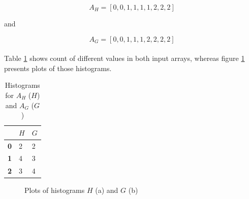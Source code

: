 \begin{equation*}
	A_H = [0,0,1,1,1,1,2,2,2]
\end{equation*}

and

\begin{equation*}
	A_G = [0,0,1,1,1,2,2,2,2]
\end{equation*}

\paragraph{}
Table \ref{tab:histogram_comparison} shows count of different values in both input arrays, whereas figure \ref{fig:histogram_comparison_plot} presents plots of those histograms.

\begin{table}[H]
    \centering
	\begin{spacing}{1.5}    
    \begin{tabular}{|l|l|l|}
        \hline
        \cellcolor{gray} & \textbf{$H$} & \textbf{$G$} \\ [0.5ex]
        \hline\hline
        \textbf{0} & 2 & 2 \\ [0.5ex]
        \hline
        \textbf{1} & 4 & 3 \\ [0.5ex]
        \hline
        \textbf{2} & 3 & 4 \\ [0.5ex]
        \hline
    \end{tabular}
    \end{spacing}
    \caption{Histograms for $A_H$ ($H$) and $A_G$ ($G$)}
    \label{tab:histogram_comparison}
\end{table}

\begin{figure}[H]
     \centering
     \qquad
     \caption{Plots of histograms $H$ (a) and $G$ (b)}
     \label{fig:histogram_comparison_plot}
\end{figure}

